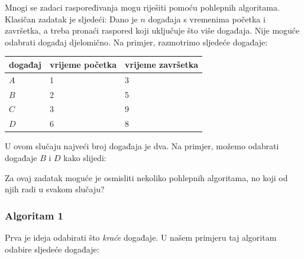 Mnogi se zadaci raspoređivanja mogu riješiti
pomoću pohlepnih algoritama.
Klasičan zadatak je sljedeći:
Dano je $n$ događaja s vremenima početka i završetka,
a treba pronaći raspored
koji uključuje što više događaja.
Nije moguće odabrati događaj djelomično.
Na primjer, razmotrimo sljedeće događaje:
\begin{center}
\begin{tabular}{lll}
događaj & vrijeme početka & vrijeme završetka \\
\hline
$A$ & 1 & 3 \\
$B$ & 2 & 5 \\
$C$ & 3 & 9 \\
$D$ & 6 & 8 \\
\end{tabular}
\end{center}
U ovom slučaju najveći broj događaja je dva.
Na primjer, možemo odabrati događaje $B$ i $D$
kako slijedi:
\begin{center}
\end{center}

Za ovaj zadatak moguće je osmisliti nekoliko pohlepnih algoritama,
no koji od njih radi u svakom slučaju?

\subsubsection*{Algoritam 1}

Prva je ideja odabirati što \emph{kraće}
događaje.
U našem primjeru taj algoritam
odabire sljedeće događaje:
\begin{center}
\end{center}

